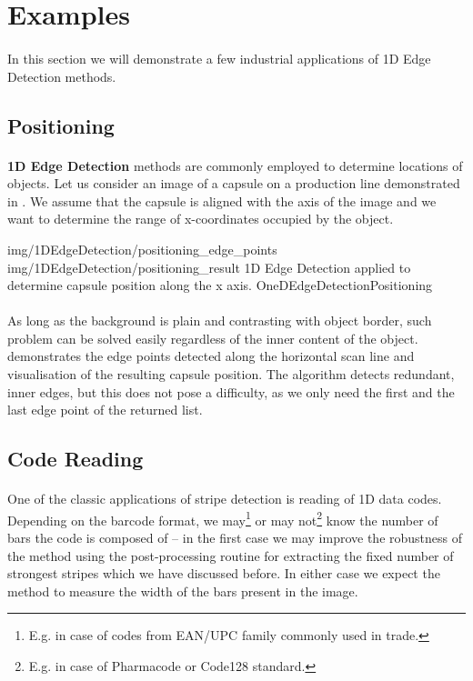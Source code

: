 \section{Examples}

\paragraph*{}
In this section we will demonstrate a few industrial applications of 1D Edge Detection methods.

\subsection{Positioning}

\paragraph*{}
\textbf{1D Edge Detection} methods are commonly employed to determine locations of objects. Let us consider an image of a capsule on a production line demonstrated in . We assume that the capsule is aligned with the axis of the image and we want to determine the range of x-coordinates occupied by the object.

\twoFigures
{img/1DEdgeDetection/positioning_edge_points}
{img/1DEdgeDetection/positioning_result}
{1D Edge Detection applied to determine capsule position along the x axis.}
{OneDEdgeDetectionPositioning}
{\basicWidth}

\paragraph*{}
As long as the background is plain and contrasting with object border, such problem can be solved easily regardless of the inner content of the object.  demonstrates the edge points detected along the horizontal scan line and visualisation of the resulting capsule position. The algorithm detects redundant, inner edges, but this does not pose a difficulty, as we only need the first and the last edge point of the returned list.

\subsection{Code Reading}

\paragraph*{}
One of the classic applications of stripe detection is reading of 1D data codes. Depending on the barcode format, we may\footnote{E.g. in case of codes from EAN/UPC family commonly used in trade.} or may not\footnote{E.g. in case of Pharmacode or Code128 standard.} know the number of bars the code is composed of -- in the first case we may improve the robustness of the method using the post-processing routine for extracting the fixed number of strongest stripes which we have discussed before. In either case we expect the method to measure the width of the bars present in the image.

